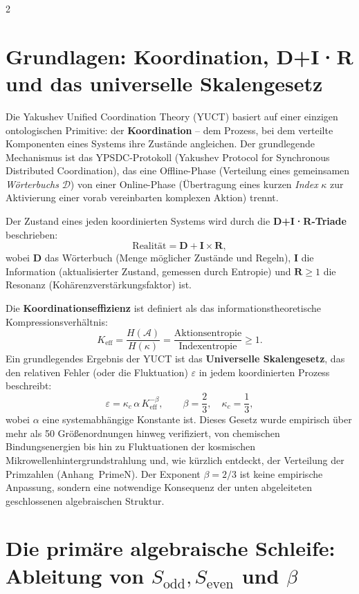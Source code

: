 \documentclass[12pt,a4paper]{article}
\newcommand{\Keff}{K_{\mathrm{eff}}}
\newcommand{\kappac}{\kappa_c}
\begin{document}
	\vspace{0.4cm}
	
	\begin{multicols}{2}
		
		\section{Grundlagen: Koordination, D+I·R und das universelle Skalengesetz}
		
		Die Yakushev Unified Coordination Theory (YUCT) basiert auf einer einzigen ontologischen Primitive: der \textbf{Koordination} – dem Prozess, bei dem verteilte Komponenten eines Systems ihre Zustände angleichen. Der grundlegende Mechanismus ist das YPSDC-Protokoll (Yakushev Protocol for Synchronous Distributed Coordination), das eine Offline-Phase (Verteilung eines gemeinsamen \textit{Wörterbuchs} \(\mathcal{D}\)) von einer Online-Phase (Übertragung eines kurzen \textit{Index} \(\kappa\) zur Aktivierung einer vorab vereinbarten komplexen Aktion) trennt.
		
		Der Zustand eines jeden koordinierten Systems wird durch die \textbf{D+I·R-Triade} beschrieben:
		\[
		\text{Realität} = \mathbf{D} + \mathbf{I} \times \mathbf{R},
		\]
		wobei \(\mathbf{D}\) das Wörterbuch (Menge möglicher Zustände und Regeln), \(\mathbf{I}\) die Information (aktualisierter Zustand, gemessen durch Entropie) und \(\mathbf{R} \ge 1\) die Resonanz (Kohärenzverstärkungsfaktor) ist.
		
		Die \textbf{Koordinationseffizienz} ist definiert als das informationstheoretische Kompressionsverhältnis:
		\[
		\Keff = \frac{H(\mathcal{A})}{H(\kappa)} = \frac{\text{Aktionsentropie}}{\text{Indexentropie}} \ge 1.
		\]
		Ein grundlegendes Ergebnis der YUCT ist das \textbf{Universelle Skalengesetz}, das den relativen Fehler (oder die Fluktuation) \(\varepsilon\) in jedem koordinierten Prozess beschreibt:
		\[
		\boxed{\varepsilon = \kappac \, \alpha \, \Keff^{-\beta}, \qquad \beta = \frac{2}{3}, \quad \kappac = \frac{1}{3}},
		\]
		wobei \(\alpha\) eine systemabhängige Konstante ist. Dieses Gesetz wurde empirisch über mehr als 50 Größenordnungen hinweg verifiziert, von chemischen Bindungsenergien bis hin zu Fluktuationen der kosmischen Mikrowellenhintergrundstrahlung und, wie kürzlich entdeckt, der Verteilung der Primzahlen (Anhang~PrimeN). Der Exponent \(\beta = 2/3\) ist keine empirische Anpassung, sondern eine notwendige Konsequenz der unten abgeleiteten geschlossenen algebraischen Struktur.
		
		\section{Die primäre algebraische Schleife: Ableitung von \(S_{\mathrm{odd}}, S_{\mathrm{even}}\) und \(\beta\)}
		

\end{multicols}
\end{document}
